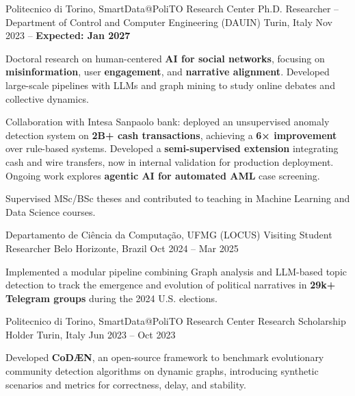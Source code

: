 
\begin{cventries}

  \cventry
    {Politecnico di Torino, SmartData@PoliTO Research Center} %
    {Ph.D. Researcher – Department of Control and Computer Engineering (DAUIN)} %
    {Turin, Italy} %
    {Nov 2023 – \textbf{Expected: Jan 2027}} %
    {
      \begin{cvitems}
        \item {Doctoral research on human-centered \textbf{AI for social networks}, focusing on \textbf{misinformation}, user \textbf{engagement}, and \textbf{narrative alignment}. Developed large-scale pipelines with LLMs and graph mining to study online debates and collective dynamics.}
       \item {Collaboration with Intesa Sanpaolo bank: deployed an unsupervised anomaly detection system on \textbf{2B+ cash transactions}, achieving a \textbf{6× improvement} over rule-based systems. Developed a \textbf{semi-supervised extension} integrating cash and wire transfers, now in internal validation for production deployment. Ongoing work explores \textbf{agentic AI for automated AML} case screening.}
        \item {Supervised MSc/BSc theses and contributed to teaching in Machine Learning and Data Science courses.}
      \end{cvitems}
    }
    
  \cventry
    {Departamento de Ciência da Computação, UFMG (LOCUS)} %
    {Visiting Student Researcher} %
    {Belo Horizonte, Brazil} %
    {Oct 2024 – Mar 2025} %
    {
      \begin{cvitems}
        \item {Implemented a modular pipeline combining Graph analysis and LLM-based topic detection to track the emergence and evolution of political narratives in \textbf{29k+ Telegram groups} during the 2024 U.S. elections.}
      \end{cvitems}
    }

  \cventry
    {Politecnico di Torino, SmartData@PoliTO Research Center} %
    {Research Scholarship Holder} %
    {Turin, Italy} %
    {Jun 2023 – Oct 2023} %
    {
      \begin{cvitems}
        \item {Developed \textbf{CoDÆN}, an open-source framework to benchmark evolutionary community detection algorithms on dynamic graphs, introducing synthetic scenarios and metrics for correctness, delay, and stability.}
      \end{cvitems}
    }


\end{cventries}
